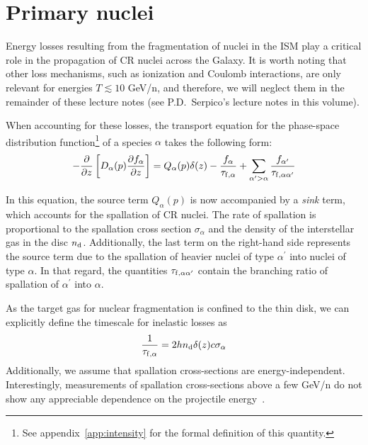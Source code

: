 \section{Primary nuclei}
\label{sec:nuclei}

Energy losses resulting from the fragmentation of nuclei in the ISM play a critical role in the propagation of CR nuclei across the Galaxy. It is worth noting that other loss mechanisms, such as ionization and Coulomb interactions, are only relevant for energies $T \lesssim 10$ GeV/n, and therefore, we will neglect them in the remainder of these lecture notes (see P.D.~Serpico's lecture notes in this volume).

When accounting for these losses, the transport equation for the phase-space distribution function\footnote{See appendix~\ref{app:intensity} for the formal definition of this quantity.} of a species $\alpha$ takes the following form:
%
\begin{equation}
-\frac{\partial}{\partial z} \left[ D_\alpha(p) \frac{\partial f_\alpha}{\partial z} \right] = 
Q_\alpha(p) \delta(z) - \frac{f_\alpha}{\tau_{\rm f, \alpha}} + \sum_{\alpha^\prime > \alpha}  \frac{f_{\alpha^\prime}}{\tau_{\rm f, \alpha\alpha^\prime}}
\end{equation}

In this equation, the source term $Q_\alpha(p)$ is now accompanied by a \emph{sink} term, which accounts for the spallation of CR nuclei. The rate of spallation is proportional to the spallation cross section $\sigma_\alpha$ and the density of the interstellar gas in the disc $n_{\rm d}$. Additionally, the last term on the right-hand side represents the source term due to the spallation of heavier nuclei of type $\alpha^\prime$ into nuclei of type $\alpha$. In that regard, the quantities $\tau_{\rm f, \alpha\alpha^\prime}$ contain the branching ratio of spallation of $\alpha^\prime$ into $\alpha$.

As the target gas for nuclear fragmentation is confined to the thin disk, we can explicitly define the timescale for inelastic losses as
%
\begin{equation}
\frac{1}{\tau_{\rm f, \alpha}} = 2 h n_{\rm d} \delta (z) c \sigma_\alpha
\label{eq:scalingcs}
\end{equation}
%
Additionally, we assume that spallation cross-sections are energy-independent. Interestingly, measurements of spallation cross-sections above a few GeV/n do not show any appreciable dependence on the projectile energy~\cite{Evoli2019prd}.

